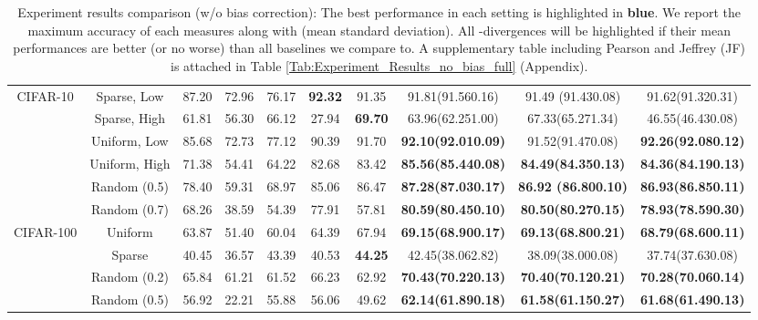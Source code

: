 \documentclass{article}
\begin{document}
\begin{table*}[!ht]
\begin{threeparttable}
\begin{tabular}{c|c|c|c|c|c|c|c|c|c}
\multirow{5}{*}{CIFAR-10}             
& Sparse, Low   & 87.20    & 72.96    & 76.17   & {\color{blue}\textbf{92.32}}  &   91.35   &  91.81(91.560.16) & 91.49 (91.430.08)  &   91.62(91.320.31) \\ \cline{2-10} 
& Sparse, High  & 61.81  & 56.30    & 66.12   & 27.94 & {\color{blue} \textbf{69.70}}        & 63.96(62.251.00) & 67.33(65.271.34) & 46.55(46.430.08)  \\\cline{2-10}
& Uniform, Low  & 85.68 & 72.73 & 77.12 & 90.39 & 91.70 & {\color{blue}\textbf{92.10(92.010.09)}} & 91.52(91.470.08) & {\color{blue}\textbf{92.26(92.080.12)}}   \\ \cline{2-10} 
& Uniform, High & 71.38  & 54.41 & 64.22 & 82.68 & 83.42 & {\color{blue}\textbf{85.56(85.440.08)}}  & {\color{blue}\textbf{84.49(84.350.13)}} &  {\color{blue}\textbf{84.36(84.190.13)}}  \\ \cline{2-10}  
& Random (0.5) & 78.40 & 59.31 & 68.97 & 85.06 & 86.47  & {\color{blue}\textbf{87.28(87.030.17)}} & {\color{blue}\textbf{86.92 (86.800.10)}}  &   {\color{blue}\textbf{86.93(86.850.11)}}  \\ 
\cline{2-10}  
& Random (0.7) & 68.26 & 38.59  &  54.39 &  77.91  & 57.81 &  {\color{blue}\textbf{80.59(80.450.10)}} & {\color{blue}\textbf{80.50(80.270.15)}} &  {\color{blue}\textbf{78.93(78.590.30)}}   \\ \hline\hline
\multirow{5}{*}{CIFAR-100}
& Uniform & 63.87 &  51.40& 60.04 & 64.39  & 67.94 & {\color{blue}\textbf{69.15(68.900.17)}} & {\color{blue}\textbf{69.13(68.800.21)}} &   {\color{blue}\textbf{68.79(68.600.11)}}\\ \cline{2-10}
& Sparse & 40.45  & 36.57 & 43.39 & 40.53  & {\color{blue}\textbf{44.25}} & 42.45(38.062.82) & 38.09(38.000.08) & 37.74(37.630.08) \\ \cline{2-10}
& Random (0.2) & 65.84  & 61.21 & 61.52 & 66.23  & 62.92 & {\color{blue}\textbf{70.43(70.220.13)}} & {\color{blue}\textbf{70.40(70.120.21)}} &  {\color{blue}\textbf{70.28(70.060.14)}}  \\ \cline{2-10}
& Random (0.5) & 56.92  & 22.21 & 55.88 & 56.06  & 49.62  & {\color{blue}\textbf{62.14(61.890.18)}} & {\color{blue}\textbf{61.58(61.150.27)}} &   {\color{blue}\textbf{61.68(61.490.13)}}  \\ \hline

\end{tabular}
\end{threeparttable}
\caption{Experiment results comparison (w/o bias correction): The best performance in each setting is highlighted in {\color{blue}\textbf{{blue}}}. \color{black}We report the maximum accuracy of each  measures along with (mean  standard deviation). All -divergences will be highlighted if their mean performances are better (or no worse) than all baselines we compare to. A supplementary table including Pearson  and Jeffrey (JF) is attached in Table \ref{Tab:Experiment_Results_no_bias_full} (Appendix).
}
\label{Tab:Experiment_Results_no_bias}
\end{table*}
\end{document}
